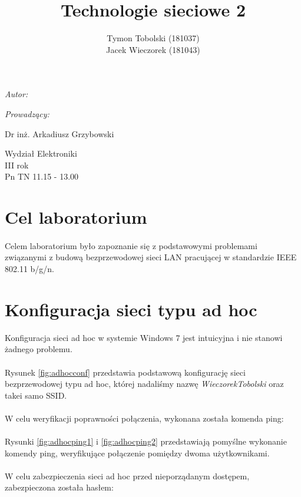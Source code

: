 \documentclass[wide,a4paper,titlepage,12pt] {article}
\title{Technologie sieciowe 2}
\author{Tymon Tobolski (181037)\\ Jacek Wieczorek (181043)}
\makeatletter
\renewcommand{\maketitle}{
\begin{titlepage}
  \begin{center}
    \vspace*{3cm}
    \LARGE \@title \par
    \vspace{2cm}
    \textit{\small Autor:}\par
    \normalsize \@author\par \normalsize
    \vspace{3cm}
    \textit{\small Prowadzący:}\par
    Dr inż. Arkadiusz Grzybowski\par
    \vspace{2cm}
    Wydział Elektroniki\\ III rok\\ Pn TN 11.15 - 13.00\par
    \vspace{4cm}
    \small \@date
  \end{center}
\end{titlepage}
}
\makeatother
\begin{document}
\maketitle
\section{Cel laboratorium}
\paragraph{}
Celem laboratorium było zapoznanie się z podstawowymi problemami związanymi z budową bezprzewodowej sieci LAN pracującej w standardzie IEEE 802.11 b/g/n.

\section{Konfiguracja sieci typu ad hoc} %
\label{sec:}
Konfiguracja sieci ad hoc w systemie Windows 7 jest intuicyjna i nie stanowi żadnego problemu. 


\paragraph{} %
\label{par:}
Rysunek \ref{fig:adhocconf} przedstawia podstawową konfigurację sieci bezprzewodowej typu ad hoc, której nadaliśmy nazwę \textit{WieczorekTobolski} oraz takei samo SSID. 
\paragraph{} %
\label{par:}
W celu weryfikacji poprawności połączenia, wykonana została komenda ping:



\paragraph{} %
\label{par:}
Rysunki \ref{fig:adhocping1} i \ref{fig:adhocping2} przedstawiają pomyślne wykonanie komendy ping, weryfikujące połączenie pomiędzy dwoma użytkownikami.
\newpage
\paragraph{} %
\label{par:}
W celu zabezpieczenia sieci ad hoc przed nieporządanym dostępem, zabezpieczona została hasłem:
\end{document}
